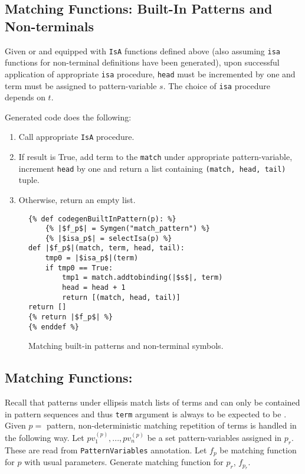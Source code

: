 \subsection{Matching Functions: Built-In Patterns and Non-terminals}
Given \BuiltInPattern \space or \NonTerminal \space and equipped with \texttt{IsA} functions defined above (also assuming \texttt{isa} functions for non-terminal definitions have been generated), upon successful application of appropriate \texttt{isa} procedure, \texttt{head} must be incremented by one and term must be assigned to pattern-variable $s$. The choice of \texttt{isa} procedure depends on $t$.

Generated code does the following:

\begin{enumerate}
\item Call appropriate \texttt{IsA} procedure. 
\item If result is True, add term to the \texttt{match} under appropriate pattern-variable, increment \texttt{head} by one and return a list containing \texttt{(match, head, tail)} tuple.
\item Otherwise, return an empty list.
\end{enumerate}
\begin{figure}[H]
\begin{verbatim}
{% def codegenBuiltInPattern(p): %}
	{% |$f_p$| = Symgen("match_pattern") %}
	{% |$isa_p$| = selectIsa(p) %}
def |$f_p$|(match, term, head, tail):
	tmp0 = |$isa_p$|(term)
	if tmp0 == True:
		tmp1 = match.addtobinding(|$s$|, term) 
		head = head + 1
		return [(match, head, tail)]
return []
{% return |$f_p$| %}
{% enddef %}
\end{verbatim}
\caption{Matching built-in patterns and non-terminal symbols.}
\label{codegen-builtin-nt-1}
\end{figure}

\subsection{Matching Functions: \RepeatNoArg}
Recall that patterns under ellipsis match lists of terms and can only be contained in pattern sequences and thus \texttt{term} argument is always to be expected to be \PatternSequence. Given $p=$ \PatternRepeat \space pattern, non-deterministic matching repetition of terms is handled in the following way. Let $pv_1^{(p)}, ..., pv_n^{(p)}$ be a set pattern-variables assigned in $p_r$. These are read from \texttt{PatternVariables} annotation.  Let $f_p$ be matching function for $p$ with usual parameters. Generate  matching function for $p_r$, $f_{p_r}$.

